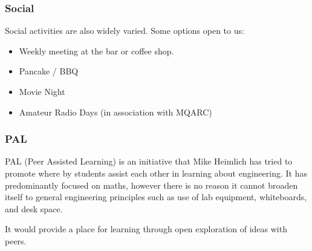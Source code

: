 \subsubsection{Social}
Social activities are also widely varied. Some options open to us:
\begin{itemize}
  \item Weekly meeting at the bar or coffee shop.
  \item Pancake / BBQ
  \item Movie Night
  \item Amateur Radio Days (in association with MQARC)
\end{itemize}

\subsubsection{PAL}
PAL (Peer Assisted Learning) is an initiative that Mike Heimlich has tried to
promote where by students assist each other in learning about engineering. It
has predominantly focused on maths, however there is no reason it cannot broaden
itself to general engineering principles such as use of lab equipment,
whiteboards, and desk space.

It would provide a place for learning through open exploration of ideas with
peers.